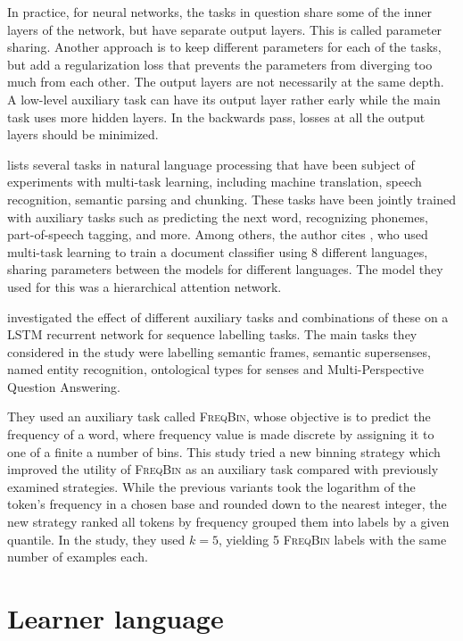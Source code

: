In practice, for neural networks, the tasks in question share some of the
inner layers of the network, but have separate output layers. This is called
parameter sharing. Another approach is to keep different parameters for each
of the tasks, but add a regularization loss that prevents the parameters from
diverging too much from each other. The output layers are not necessarily at
the same depth. A low-level auxiliary task can have its output layer rather
early while the main task uses more hidden layers. In the backwards pass,
losses at all the output layers should be minimized.

\textcite{ruder17} lists several tasks in natural language processing that
have been subject of experiments with multi-task learning, including machine
translation, speech recognition, semantic parsing and chunking. These tasks
have been jointly trained with auxiliary tasks such as predicting the next
word, recognizing phonemes, part-of-speech tagging, and more. Among others,
the author cites \textcite{pappas17}, who used multi-task learning to train a
document classifier using 8 different languages, sharing parameters between
the models for different languages. The model they used for this was a
hierarchical attention network.

\textcite{alonso17} investigated the effect of different auxiliary tasks and
combinations of these on a \ac{LSTM} recurrent network for sequence labelling
tasks. The main tasks they considered in the study were labelling semantic
frames, semantic supersenses, named entity recognition, ontological types for
senses and Multi-Perspective Question Answering.

They used an auxiliary task called \textsc{FreqBin}, whose objective is to
predict the frequency of a word, where frequency value is made discrete by
assigning it to one of a finite a number of bins. This study tried a new
binning strategy which improved the utility of \textsc{FreqBin} as an
auxiliary task compared with previously examined strategies. While the
previous variants took the logarithm of the token's frequency in a chosen
base and rounded down to the nearest integer, the new strategy ranked all
tokens by frequency grouped them into labels by a given quantile. In the
study, they used $k=5$, yielding 5 \textsc{FreqBin} labels with the same
number of examples each.


\section{Learner language}

